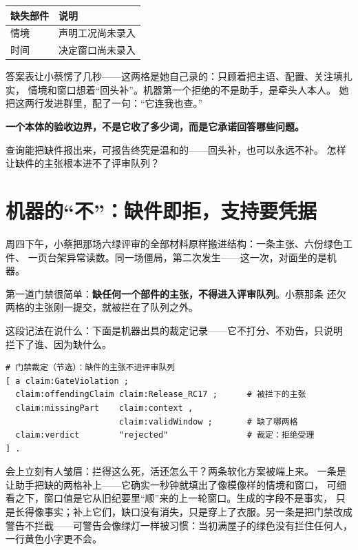 \begin{center}
\begingroup\small
\setlength{\tabcolsep}{4pt}
\begin{tabularx}{\linewidth}{@{}XX@{}}
\toprule
缺失部件 & 说明 \\
\midrule
情境 & 声明工况尚未录入 \\
时间 & 决定窗口尚未录入 \\
\bottomrule
\end{tabularx}
\endgroup
\end{center}

答案表让小蔡愣了几秒——这两格是她自己录的：只顾着把主语、配置、关注填扎实，
情境和窗口想着“回头补”。机器第一个拒绝的不是助手，是牵头人本人。
她把这两行发进群里，配了一句：“它连我也查。”

\textbf{一个本体的验收边界，不是它收了多少词，而是它承诺回答哪些问题。}

查询能把缺件报出来，可报告终究是温和的——回头补，也可以永远不补。
怎样让缺件的主张根本进不了评审队列？

\section{机器的“不”：缺件即拒，支持要凭据}

周四下午，小蔡把那场六绿评审的全部材料原样搬进结构：一条主张、六份绿色工件、
一页台架异常读数。同一场僵局，第二次发生——这一次，对面坐的是机器。

第一道门禁很简单：\textbf{缺任何一个部件的主张，不得进入评审队列}。小蔡那条
还欠两格的主张刚一提交，就被拦在了队列之外。

这段记法在说什么：下面是机器出具的裁定记录——它不打分、不劝告，只说明
拦下了谁、因为缺什么。

\nopagebreak[4]
\begin{codebox}
\begin{Verbatim}[fontsize=\small,breaklines=true,breakanywhere=true,breaksymbolleft={},breaksymbolright={}]
# 门禁裁定（节选）：缺件的主张不进评审队列
[ a claim:GateViolation ;
  claim:offendingClaim claim:Release_RC17 ;      # 被拦下的主张
  claim:missingPart    claim:context ,
                       claim:validWindow ;       # 缺了哪两格
  claim:verdict        "rejected"                # 裁定：拒绝受理
] .
\end{Verbatim}
\end{codebox}

会上立刻有人皱眉：拦得这么死，活还怎么干？两条软化方案被端上来。
一条是让助手把缺的两格补上——它确实一秒钟就填出了像模像样的情境和窗口，
可细看之下，窗口值是它从旧纪要里“顺”来的上一轮窗口。生成的字段不是事实，
只是长得像事实；补上它们，缺口没有消失，只是穿上了衣服。另一条是把门禁改成
警告不拦截——可警告会像绿灯一样被习惯：当初满屋子的绿色没有拦住任何人，
一行黄色小字更不会。

